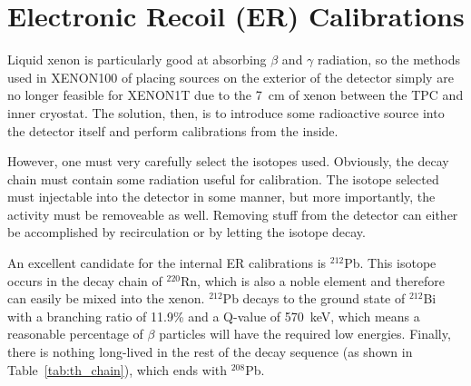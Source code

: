 
\chapter{Electronic Recoil (ER) Calibrations}

Liquid xenon is particularly good at absorbing $\beta$ and $\gamma$ radiation, so the methods used in XENON100 of placing sources on the exterior of the detector simply are no longer feasible for XENON1T due to the \SI{7}{cm} of xenon between the TPC and inner cryostat. The solution, then, is to introduce some radioactive source into the detector itself and perform calibrations from the inside.

However, one must very carefully select the isotopes used. Obviously, the decay chain must contain some radiation useful for calibration. The isotope selected must injectable into the detector in some manner, but more importantly, the activity must be removeable as well. Removing stuff from the detector can either be accomplished by recirculation or by letting the isotope decay.

An excellent candidate for the internal ER calibrations is $^{212}$Pb. This isotope occurs in the decay chain of $^{220}$Rn, which is also a noble element and therefore can easily be mixed into the xenon. $^{212}$Pb decays to the ground state of $^{212}$Bi with a branching ratio of 11.9\% and a Q-value of \SI{570}{keV}, which means a reasonable percentage of $\beta$ particles will have the required low energies. Finally, there is nothing long-lived in the rest of the decay sequence (as shown in Table~\ref{tab:th_chain}), which ends with $^{208}$Pb.

